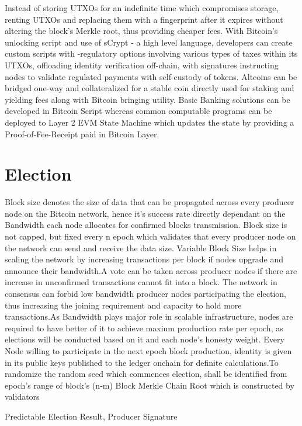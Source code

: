 \documentclass[a4paper,10pt]{article}
\begin{document}
Instead of storing UTXOs for an indefinite time which compromises storage, renting UTXOs and replacing them with a fingerprint after it expires without altering the block's Merkle root, thus providing cheaper fees. With Bitcoin's unlocking script and use of sCrypt - a high level language, developers can create custom scripts with -regulatory options involving various types of taxes within its UTXOs, offloading identity verification off-chain, with signatures instructing nodes to validate regulated payments with self-custody of tokens. Altcoins can be bridged one-way and collateralized for a stable coin directly used for staking and yielding fees along with Bitcoin bringing utility. Basic Banking solutions can be developed in Bitcoin Script whereas common computable programs can be deployed to Layer 2 EVM State Machine which updates the state by providing a Proof-of-Fee-Receipt paid in Bitcoin Layer. 
\section{Election}
Block size denotes the size of data that can be propagated across every producer node on the Bitcoin network, hence it's success rate directly dependant on the Bandwidth each node allocates for confirmed blocks transmission. Block size is not capped, but fixed every n epoch which validates that every producer node on the network can send and receive the data size. Variable Block Size helps in scaling the network by increasing transactions per block if nodes upgrade and announce their bandwidth.A vote can be taken across producer nodes if there are increase in unconfirmed transactions cannot fit into a block. The network in consensus can forbid low bandwidth producer nodes participating the election, thus increasing the joining requirement and capacity to hold more transactions.As Bandwidth plays major role in scalable infrastructure, nodes are required to have better of it to achieve maxium production rate per epoch, as elections will be conducted based on it and each node's honesty weight. Every Node willing to participate in the next epoch block production, identity is given in its public keys published to the ledger onchain for definite calculations.To randomize the random seed which commences election, shall be identified from epoch's range of block's (n-m) Block Merkle Chain Root which is constructed by validators

Predictable Election Result, Producer Signature
\end{document}
